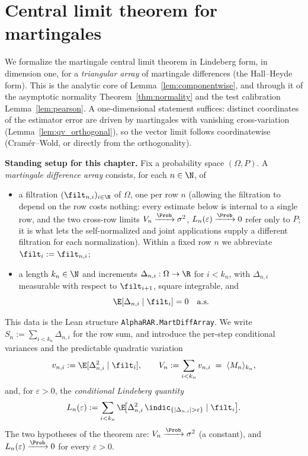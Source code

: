 \chapter{Central limit theorem for martingales}
\label{chap:pre_clt}

We formalize the martingale central limit theorem in Lindeberg form, in dimension
one, for a \emph{triangular array} of martingale differences (the Hall--Heyde
form). This is the analytic core of Lemma~\ref{lem:componentwise}, and through it
of the asymptotic normality Theorem~\ref{thm:normality} and the test calibration
Lemma~\ref{lem:pearson}. A one-dimensional statement suffices: distinct
coordinates of the estimator error are driven by martingales with vanishing
cross-variation (Lemma~\ref{lem:qv_orthogonal}), so the vector limit follows
coordinatewise (Cram\'er--Wold, or directly from the orthogonality).

\medskip

\textbf{Standing setup for this chapter.} Fix a probability space $(\Omega,P)$.
A \emph{martingale difference array} consists, for each $n\in\N$, of
\begin{itemize}
  \item a filtration $(\filt_{n,i})_{i\in\N}$ of $\Omega$, one per row $n$ (allowing
        the filtration to depend on the row costs nothing: every estimate below is
        internal to a single row, and the two cross-row limits
        $V_n\xrightarrow{\Prob}\sigma^2$, $L_n(\varepsilon)\xrightarrow{\Prob}0$ refer
        only to $P$; it is what lets the self-normalized and joint applications supply a
        different filtration for each normalization). Within a fixed row $n$ we
        abbreviate $\filt_i:=\filt_{n,i}$;
  \item a length $k_n\in\N$ and increments $\Delta_{n,i}:\Omega\to\R$ for $i<k_n$,
        with $\Delta_{n,i}$ measurable with respect to $\filt_{i+1}$, square
        integrable, and
        \[
          \E[\Delta_{n,i}\mid\filt_{i}] = 0 \quad\text{a.s.}
        \]
\end{itemize}
This data is the Lean structure \texttt{AlphaRAR.MartDiffArray}. We write
$S_n := \sum_{i<k_n}\Delta_{n,i}$ for the row sum, and introduce the per-step
conditional variances and the predictable quadratic variation
\[
  v_{n,i} := \E[\Delta_{n,i}^2\mid\filt_{i}], \qquad
  V_n := \sum_{i<k_n} v_{n,i} \;=\; \langle M_n\rangle_{k_n},
\]
and, for $\varepsilon>0$, the \emph{conditional Lindeberg quantity}
\[
  L_n(\varepsilon) := \sum_{i<k_n}
    \E\!\big[\Delta_{n,i}^2\,\indic_{\{|\Delta_{n,i}|>\varepsilon\}}\mid\filt_{i}\big].
\]
The two hypotheses of the theorem are: $V_n\xrightarrow{\Prob}\sigma^2$ (a
constant), and $L_n(\varepsilon)\xrightarrow{\Prob}0$ for every $\varepsilon>0$.

